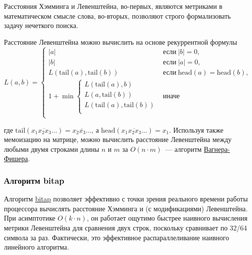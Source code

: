 Расстояния Хэмминга и Левенштейна, во-первых, являются метриками в математическом смысле слова, во-вторых, позволяют строго
формализовать задачу нечеткого поиска.

Расстояние Левенштейна можно вычислить на основе рекуррентной формулы \[L(a,b) = \begin{cases}
    |a|                                  & \text{если}~|b| = 0,                         \\
    |b|                                  & \text{если}~|a| = 0,                         \\
    L(\text{tail}(a), \text{tail}(b))    & \text{если}~\text{head}(a) = \text{head}(b), \\
    1 + \min \begin{cases}
               L(\text{tail}(a), b)              \\
               L(a, \text{tail}(b))              \\
               L(\text{tail}(a), \text{tail}(b)) \\
             \end{cases} & \text{иначе}                                          \\
  \end{cases}
\]

где \(\text{tail}(\overline{x_1x_2x_3\dots}) = \overline{x_2x_3\dots}\), а \(\text{head}(\overline{x_1x_2x_3\dots}) = x_1\).
Используя также мемоизацию на матрице, можно вычислить расстояние Левенштейна между любыми двумя строками длины \(n\) и \(m\) за
\(O(n\cdot m)\)~--- алгоритм \href{https://neerc.ifmo.ru/wiki/index.php?title=%D0%97%D0%B0%D0%B4%D0%B0%D1%87%D0%B0_%D0%BE_%D1%80%D0%B5%D0%B4%D0%B0%D0%BA%D1%86%D0%B8%D0%BE%D0%BD%D0%BD%D0%BE%D0%BC_%D1%80%D0%B0%D1%81%D1%81%D1%82%D0%BE%D1%8F%D0%BD%D0%B8%D0%B8,_%D0%B0%D0%BB%D0%B3%D0%BE%D1%80%D0%B8%D1%82%D0%BC_%D0%92%D0%B0%D0%B3%D0%BD%D0%B5%D1%80%D0%B0-%D0%A4%D0%B8%D1%88%D0%B5%D1%80%D0%B0}{Вагнера-Фишера}.

\subsubsection{Алгоритм bitap}
Алгоритм \href{https://en.wikipedia.org/wiki/Bitap_algorithm}{bitap} позволяет эффективно с точки зрения реального времени работы процессора вычислять расстояние Хэмминга и
(с модификациями) Левенштейна. При асимптотике \(O(k\cdot n)\), он работает ощутимо быстрее наивного вычисления метрики
Левенштейна для сравнения двух строк, поскольку сравнивает по 32/64 символа за раз. Фактически, это эффективное
распараллеливание наивного линейного алгоритма.

